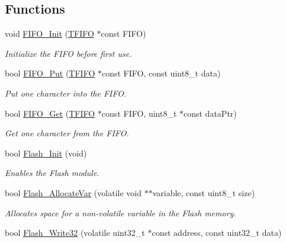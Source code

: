 \subsection*{Functions}
\begin{DoxyCompactItemize}
\item 
void \hyperlink{group__main__module_gad9207f49ab9ed061b6dca6063112ca60}{F\+I\+F\+O\+\_\+\+Init} (\hyperlink{struct_t_f_i_f_o}{T\+F\+I\+FO} $\ast$const F\+I\+FO)
\begin{DoxyCompactList}\small\item\em Initialize the F\+I\+FO before first use. \end{DoxyCompactList}\item 
bool \hyperlink{group__main__module_gace64ba4e6bd943f990a294693156cc3b}{F\+I\+F\+O\+\_\+\+Put} (\hyperlink{struct_t_f_i_f_o}{T\+F\+I\+FO} $\ast$const F\+I\+FO, const uint8\+\_\+t data)
\begin{DoxyCompactList}\small\item\em Put one character into the F\+I\+FO. \end{DoxyCompactList}\item 
bool \hyperlink{group__main__module_ga6407e3daf24a826a7f17d3e48865e89a}{F\+I\+F\+O\+\_\+\+Get} (\hyperlink{struct_t_f_i_f_o}{T\+F\+I\+FO} $\ast$const F\+I\+FO, uint8\+\_\+t $\ast$const data\+Ptr)
\begin{DoxyCompactList}\small\item\em Get one character from the F\+I\+FO. \end{DoxyCompactList}\item 
bool \hyperlink{group__main__module_gaa5782279b5e558cafc2f135c0a1177d3}{Flash\+\_\+\+Init} (void)
\begin{DoxyCompactList}\small\item\em Enables the Flash module. \end{DoxyCompactList}\item 
bool \hyperlink{group__main__module_ga50871aff0f5af1e092aea3ed2545cf72}{Flash\+\_\+\+Allocate\+Var} (volatile void $\ast$$\ast$variable, const uint8\+\_\+t size)
\begin{DoxyCompactList}\small\item\em Allocates space for a non-\/volatile variable in the Flash memory. \end{DoxyCompactList}\item 
bool \hyperlink{group__main__module_ga5da7dcc0c6ef765546c79bbe25b48479}{Flash\+\_\+\+Write32} (volatile uint32\+\_\+t $\ast$const address, const uint32\+\_\+t data)
$$
\end{DoxyCompactItemize}
